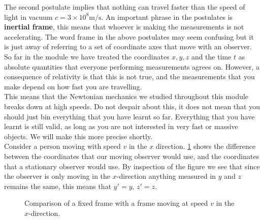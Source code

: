 The second postulate implies that nothing can travel faster than the speed of light in vacuum $c=3\times 10^{8}\text{m/s}$. An important phrase in the postulates is \textbf{inertial frame}, this means that whoever is making the measurements is not accelerating. The word frame in the above postulates may seem confusing but it is just away of referring to a set of coordinate axes that move with an observer. So far in the module we have treated the coordinates $x,y,z$ and the time $t$ as absolute quantities that everyone performing measurements agrees on. However, a consequence of relativity is that this is not true, and the measurements that you make depend on how fast you are travelling.\\

This means that the Newtonian mechanics we studied throughout this module breaks down at high speeds. Do not despair about this, it does not mean that you should just bin everything that you have learnt so far. Everything that you have learnt is still valid, as long as you are not interested in very fast or massive objects. We will make this more precise shortly.\\

Consider a person moving with speed $v$ in the $x$ direction. \cref{fig: moving frames} shows the difference between the coordinates that our moving observer would use, and the coordinates that a stationary observer would use. By inspection of the figure we see that since the observer is only moving in the $x$-direction anything measured in $y$ and $z$ remains the same, this means that $y'=y,\,z'=z$.\\

\begin{figure}[ht]
    \centering
    \caption{Comparison of a fixed frame with a frame moving at speed $v$ in the $x$-direction.}
    \label{fig: moving frames}
\end{figure} 

